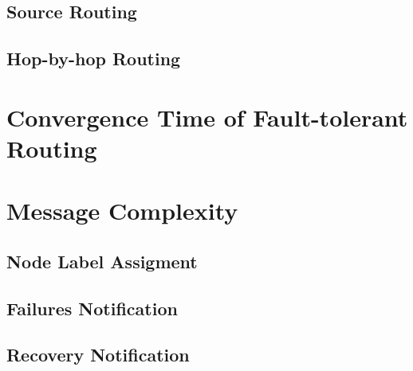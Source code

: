     \subsection{Source Routing}

    \subsection{Hop-by-hop Routing}

\section{Convergence Time of Fault-tolerant Routing}

\section{Message Complexity}

    \subsection{Node Label Assigment}

    \subsection{Failures Notification}

    \subsection{Recovery Notification}


